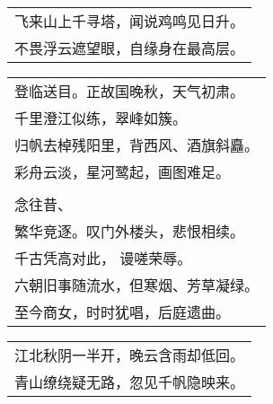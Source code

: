 \nopagebreak%
\nopagebreak%
\noindent\begin{minipage}{\linewidth}
  \vskip-3pt\begin{table}[H]
    \centering
    \begin{tabular}{@{}l@{}}
飞来山上千寻塔，闻说鸡鸣见日升。\\
不畏浮云遮望眼，自缘身在最高层。
    \end{tabular}
  \end{table}
\end{minipage}
\vspace{1cm}


\nopagebreak%
\nopagebreak%
\noindent\begin{minipage}{\linewidth}
  \vskip-3pt\begin{table}[H]
    \centering
    \begin{tabular}{@{}l@{}}
登临送目。正故国晚秋，天气初肃。\\
千里澄江似练，翠峰如簇。\\
归帆去棹残阳里，背西风、酒旗斜矗。\\
彩舟云淡，星河鹭起，画图难足。\\
\\
念往昔、\\
繁华竞逐。叹门外楼头，悲恨相续。\\
千古凭高对此， 谩嗟荣辱。\\
六朝旧事随流水，但寒烟、芳草凝绿。\\
至今商女，时时犹唱，后庭遗曲。
    \end{tabular}
  \end{table}
\end{minipage}
\vspace{1cm}


\nopagebreak%
\nopagebreak%
\noindent\begin{minipage}{\linewidth}
  \vskip-3pt\begin{table}[H]
    \centering
    \begin{tabular}{@{}l@{}}
江北秋阴一半开，晚云含雨却低回。\\
青山缭绕疑无路，忽见千帆隐映来。
    \end{tabular}
  \end{table}
\end{minipage}
\vspace{1cm}


